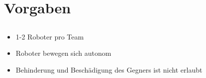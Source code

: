 \section{Vorgaben}
\subsection{\eurobot}

\begin{frame}
	\frametitle{\eurobot} %
	
	\begin{itemize}
		\item 1-2 Roboter pro Team
		\item Roboter bewegen sich autonom
		\item Behinderung und Beschädigung des Gegners ist nicht erlaubt
	\end{itemize}
	
\end{frame}

